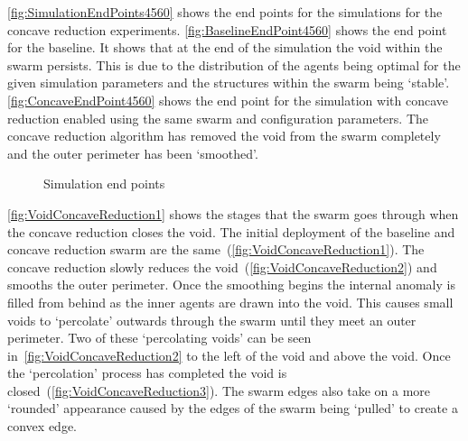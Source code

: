 \autoref{fig:SimulationEndPoints4560} shows the end points for the simulations for the concave reduction experiments. \autoref{fig:BaselineEndPoint4560} shows the end point for the baseline. It shows that at the end of the simulation the void within the swarm persists. This is due to the distribution of the agents being optimal for the given simulation parameters and the structures within the swarm being `stable'. \autoref{fig:ConcaveEndPoint4560} shows the end point for the simulation with concave reduction enabled using the same swarm and configuration parameters. The concave reduction algorithm has removed the void from the swarm completely and the outer perimeter has been `smoothed'. 

\begin{figure}[H]
\centering
\caption{Simulation end points}
\label{fig:SimulationEndPoints4560}
\end{figure} 

\autoref{fig:VoidConcaveReduction1} shows the stages that the swarm goes through when the concave reduction closes the void. The initial deployment of the baseline and concave reduction swarm are the same~(\autoref{fig:VoidConcaveReduction1}). The concave reduction slowly reduces the void~(\autoref{fig:VoidConcaveReduction2}) and smooths the outer perimeter. Once the smoothing begins the internal anomaly is filled from behind as the inner agents are drawn into the void. This causes small voids to `percolate' outwards through the swarm until they meet an outer perimeter. Two of these `percolating voids' can be seen in~\autoref{fig:VoidConcaveReduction2} to the left of the void and above the void. Once the `percolation' process has completed the void is closed~(\autoref{fig:VoidConcaveReduction3}). The swarm edges also take on a more `rounded' appearance caused by the edges of the swarm being `pulled' to create a convex edge.

